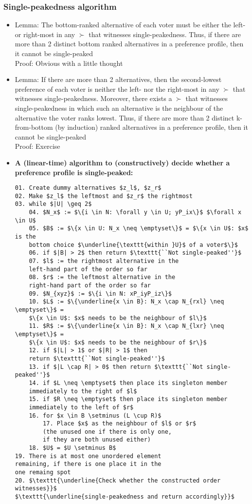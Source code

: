 \documentclass[20pt,a4paper,landscape]{extarticle}
\begin{document}
\begin{flushleft}
\subsubsection{Single-peakedness algorithm}
\begin{itemize}
\item Lemma: The bottom-ranked alternative of each voter must be either the left- or right-most in any $\succ$ that witnesses single-peakedness. Thus, if there are more than 2 distinct bottom ranked alternatives in a preference profile, then it cannot be single-peaked\\
Proof: Obvious with a little thought
\item Lemma: If there are more than 2 alternatives, then the second-lowest preference of each voter is neither the left- nor the right-most in any $\succ$ that witnesses single-peakedness. Moreover, there exists a $\succ$ that witnesses single-peakedness in which such an alternative is the neighbour of the alternative the voter ranks lowest. Thus, if there are more than 2 distinct k-from-bottom (by induction) ranked alternatives in a preference profile, then it cannot be single-peaked\\
Proof: Exercise
\item \textbf{A (linear-time) algorithm to (constructively) decide whether a preference profile is single-peaked:}
\begin{lstlisting}
01. Create dummy alternatives $z_l$, $z_r$
02. Make $z_l$ the leftmost and $z_r$ the rightmost
03. while $|U| \geq 2$
    04. $N_x$ := $\{i \in N: \forall y \in U; yP_ix\}$ $\forall x \in U$
    05. $B$ := $\{x \in U: N_x \neq \emptyset\}$ = $\{x \in U$: $x$ is the
    bottom choice $\underline{\texttt{within }U}$ of a voter$\}$
    06. if $|B| > 2$ then return $\texttt{``Not single-peaked''}$
    07. $l$ := the rightmost alternative in the
    left-hand part of the order so far
    08. $r$ := the leftmost alternative in the
    right-hand part of the order so far
    09. $N_{xyz}$ := $\{i \in N: xP_iyP_iz\}$
    10. $L$ := $\{\underline{x \in B}: N_x \cap N_{rxl} \neq \emptyset\}$ =
    $\{x \in U$: $x$ needs to be the neighbour of $l\}$
    11. $R$ := $\{\underline{x \in B}: N_x \cap N_{lxr} \neq \emptyset\}$ =
    $\{x \in U$: $x$ needs to be the neighbour of $r\}$
    12. if $|L| > 1$ or $|R| > 1$ then
    return $\texttt{``Not single-peaked''}$
    13. if $|L \cap R| > 0$ then return $\texttt{``Not single-peaked''}$
    14. if $L \neq \emptyset$ then place its singleton member
    immediately to the right of $l$
    15. if $R \neq \emptyset$ then place its singleton member
    immediately to the left of $r$
    16. for $x \in B \setminus (L \cup R)$
        17. Place $x$ as the neighbour of $l$ or $r$
        (the unused one if there is only one,
        if they are both unused either)
    18. $U$ = $U \setminus B$
19. There is at most one unordered element
remaining, if there is one place it in the
one remaing spot
20. $\texttt{\underline{Check whether the constructed order witnesses}}$
$\texttt{\underline{single-peakedness and return accordingly}}$
\end{lstlisting}
\end{itemize}

\end{flushleft}
\end{document}
